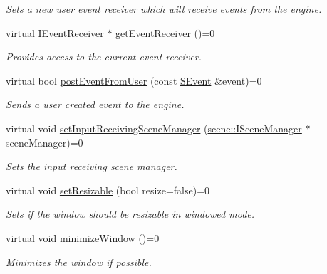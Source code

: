\begin{DoxyCompactItemize}
\begin{DoxyCompactList}\small\item\em Sets a new user event receiver which will receive events from the engine. \end{DoxyCompactList}\item 
virtual \hyperlink{classirr_1_1IEventReceiver}{I\+Event\+Receiver} $\ast$ \hyperlink{classirr_1_1IrrlichtDevice_a26227e20e46915942d067532c61df42b}{get\+Event\+Receiver} ()=0
\begin{DoxyCompactList}\small\item\em Provides access to the current event receiver. \end{DoxyCompactList}\item 
virtual bool \hyperlink{classirr_1_1IrrlichtDevice_abf859e39f017b0403c6ed331e48e01df}{post\+Event\+From\+User} (const \hyperlink{structirr_1_1SEvent}{S\+Event} \&event)=0
\begin{DoxyCompactList}\small\item\em Sends a user created event to the engine. \end{DoxyCompactList}\item 
virtual void \hyperlink{classirr_1_1IrrlichtDevice_a22ab84f23050dbef122f16a33aa9b91d}{set\+Input\+Receiving\+Scene\+Manager} (\hyperlink{classirr_1_1scene_1_1ISceneManager}{scene\+::\+I\+Scene\+Manager} $\ast$scene\+Manager)=0
\begin{DoxyCompactList}\small\item\em Sets the input receiving scene manager. \end{DoxyCompactList}\item 
virtual void \hyperlink{classirr_1_1IrrlichtDevice_a4911502bd085d2d87474ff12959bc341}{set\+Resizable} (bool resize=false)=0
\begin{DoxyCompactList}\small\item\em Sets if the window should be resizable in windowed mode. \end{DoxyCompactList}\item 
\mbox{\label{classirr_1_1IrrlichtDevice_a23e31ff31f564d5e715edc901e519311}} 
virtual void \hyperlink{classirr_1_1IrrlichtDevice_a23e31ff31f564d5e715edc901e519311}{minimize\+Window} ()=0
\begin{DoxyCompactList}\small\item\em Minimizes the window if possible. \end{DoxyCompactList}\item 

\end{DoxyCompactItemize}
